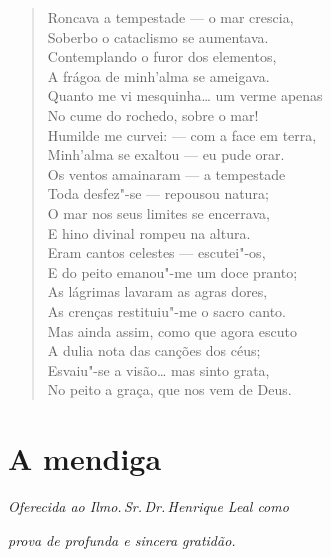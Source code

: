\begin{verse}
Roncava a tempestade --- o mar crescia,\\
Soberbo o cataclismo se aumentava.\\
Contemplando o furor dos elementos,\\
A frágoa de minh'alma se ameigava.\\
Quanto me vi mesquinha\ldots{} um verme apenas\\
No cume do rochedo, sobre o mar!\\
Humilde me curvei: --- com a face em terra,\\
Minh'alma se exaltou --- eu pude orar.\\
Os ventos amainaram --- a tempestade\\
Toda desfez"-se --- repousou natura;\\
O mar nos seus limites se encerrava,\\
E hino divinal rompeu na altura.\\
Eram cantos celestes --- escutei"-os,\\
E do peito emanou"-me um doce pranto;\\
As lágrimas lavaram as agras dores,\\
As crenças restituiu"-me o sacro canto.\\
Mas ainda assim, como que agora escuto\\
A dulia nota das canções dos céus;\\
Esvaiu"-se a visão\ldots{} mas sinto grata,\\
No peito a graça, que nos vem de Deus.
\end{verse}

\chapter{A mendiga}

\hfill{}\emph{Oferecida ao Ilmo.\,Sr.\,Dr.\,Henrique Leal como}

\hfill{}\emph{prova de profunda e sincera gratidão.}

\medskip

